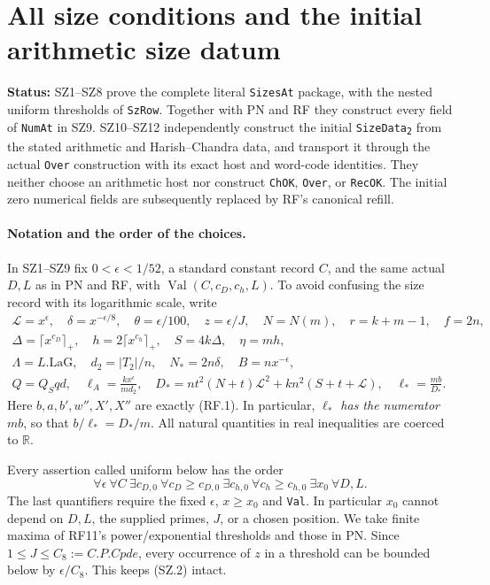 \documentclass[11pt,a4paper]{article}
\numberwithin{equation}{section}
\theoremstyle{remark}\newtheorem{remark}[theorem]{Remark}
\newcommand{\status}[1]{\textbf{Status:} #1}
\begin{document}
\section{All size conditions and the initial arithmetic size datum}
\label{sec:size-conditions}

\status{SZ1--SZ8 prove the complete literal \texttt{SizesAt}
package, with the nested uniform thresholds of \texttt{SzRow}.
Together with PN and RF they construct every field of \texttt{NumAt}
in SZ9. SZ10--SZ12 independently construct the initial
\texttt{SizeData\textsubscript{2}} from the stated arithmetic and
Harish--Chandra data, and transport it through the actual
\texttt{Over} construction with its exact host and word-code identities.
They neither choose an arithmetic host nor construct
\texttt{ChOK}, \texttt{Over}, or \texttt{RecOK}.
The initial zero numerical fields are subsequently replaced by RF's
canonical refill.}

\paragraph{Notation and the order of the choices.}
In SZ1--SZ9 fix $0<\epsilon<1/52$, a standard constant record $C$,
and the same actual $D,L$ as in PN and RF, with
$\operatorname{Val}(C,c_D,c_h,L)$. To avoid confusing the size record
with its logarithmic scale, write
\[
 \begin{gathered}
 \mathcal L=x^\epsilon,\quad \delta=x^{-\epsilon/8},\quad
 \theta=\epsilon/100,\quad z=\epsilon/J,\quad
 N=N(m),\quad r=k+m-1,\quad f=2n,\\
 \Delta=\lceil x^{c_D}\rceil_+,\quad
 h=2\lceil x^{c_h}\rceil_+,\quad S=4k\Delta,\quad \eta=mh,\\
 \Lambda=L.\mathrm{LaG},\quad d_2=|T_2|/n,\quad
 N_* =2n\delta,\quad B=n x^{-\epsilon},\\
 Q=Q_Sqd,\quad \ell_A=\frac{kx^\epsilon}{md_2},\quad
 D_*=nt^2(N+t)\mathcal L^2+kn^2(S+t+\mathcal L),\quad
 \ell_* =\frac{mb}{D_*}.
 \end{gathered}                                                   \tag{SZ.1}
\]
Here $b,a,b',w'',X',X''$ are exactly (RF.1). In particular,
\emph{$\ell_*$ has the numerator $mb$}, so that
$b/\ell_*=D_*/m$. All natural quantities in real inequalities are
coerced to $\mathbb R$.

Every assertion called uniform below has the order
\[
 \forall\epsilon\ \forall C\ \exists c_{D,0}\
 \forall c_D\geq c_{D,0}\ \exists c_{h,0}\
 \forall c_h\geq c_{h,0}\ \exists x_0\
 \forall D,L.                                                    \tag{SZ.2}
\]
The last quantifiers require the fixed $\epsilon$, $x\geq x_0$ and
\texttt{Val}. In particular $x_0$ cannot depend on $D,L$, the supplied
primes, $J$, or a chosen position. We take finite maxima of RF11's
power/exponential thresholds and those in PN. Since
$1\leq J\leq C_8:=C.P.Cpde$, every occurrence of $z$ in a threshold
can be bounded below by $\epsilon/C_8$. This keeps (SZ.2) intact.
\end{document}
